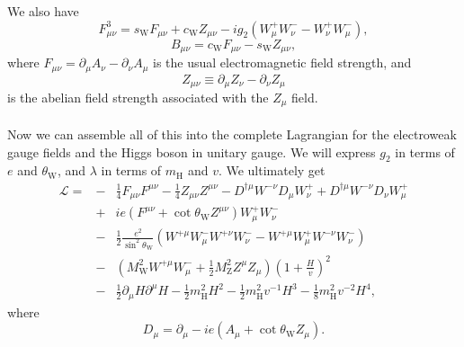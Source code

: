 We also have
\[F^3_{\mu\nu} = s_{\mathrm{W}}F_{\mu\nu} + c_{\mathrm{W}} Z_{\mu\nu} -ig_2(W_{\mu}^+ W_{\nu}^- - W_{\nu}^+ W_{\mu}^-),\]
\[B_{\mu\nu} = c_{\mathrm{W}}F_{\mu\nu} - s_{\mathrm{W}} Z_{\mu\nu},\]
where $F_{\mu\nu} = \partial_{\mu}A_{\nu} - \partial_{\nu}A_{\mu}$ is the usual electromagnetic field strength, and
\[Z_{\mu\nu} \equiv \partial_{\mu}Z_{\nu} - \partial_{\nu}Z_{\mu} \]
is the abelian field strength associated with the $Z_{\mu}$ field.
\\ \\
Now we can assemble all of this into the complete Lagrangian for the electroweak gauge fields and the Higgs boson in unitary gauge. We will express $g_2$ in terms of $e$ and $\theta_{\mathrm{W}}$, and $\lambda$ in terms of $m_{\mathrm{H}}$ and
$v$. We ultimately get
\begin{eqnarray}
\mathcal{L} = &-& \frac{1}{4} F_{\mu\nu}F^{\mu\nu} - \frac{1}{4} Z_{\mu\nu}Z^{\mu\nu} - D^{\dagger\mu}W^{-\nu}D_{\mu}W^{+}_{\nu} + D^{\dagger\mu}W^{-\nu}D_{\nu}W^{+}_{\mu} \nonumber \\
&+& ie(F^{\mu\nu} + \cot\theta_{\mathrm{W}} Z^{\mu\nu})W_{\mu}^+ W_{\nu}^- \nonumber \\
&-& \frac{1}{2} \frac{e^2}{\sin^2\theta_{\mathrm{W}}} (W^{+\mu}W_{\mu}^{-}W^{+\nu}W_{\nu}^{-} -W^{+\mu}W_{\mu}^{+}W^{-\nu}W_{\nu}^{-} ) \nonumber \\
&-& (M_{\mathrm{W}}^2 W^{+\mu} W^{-}_{\mu} + \frac{1}{2}M_{\mathrm{Z}}^2 Z^{\mu}Z_{\mu})(1 + \frac{H}{v})^2 \nonumber \\
&-& \frac{1}{2}\partial_{\mu}H \partial^{\mu}H  - \frac{1}{2}m_{\mathrm{H}}^2 H^2  - \frac{1}{2}m_{\mathrm{H}}^2 v^{-1} H^3 -  \frac{1}{8}m_{\mathrm{H}}^2 v^{-2}H^4, \nonumber
\end{eqnarray}
where
\[D_{\mu} = \partial_{\mu} -ie(A_{\mu} + \cot\theta_{\mathrm{W}}Z_{\mu}).\]

